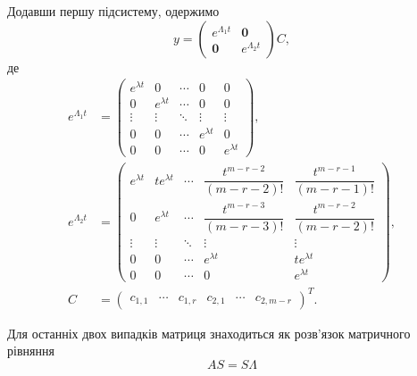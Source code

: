 \begin{enumerate}
Додавши першу підсистему, одержимо
\begin{equation*}
	y = \begin{pmatrix} e^{\Lambda_1 t} & \textbf{0} \\ \textbf{0} & e^{\Lambda_2 t} \end{pmatrix} C,
\end{equation*}
де
\begin{align*}
	e^{\Lambda_1 t} &= 
	\begin{pmatrix} 
		e^{\lambda t} & 0 & \cdots & 0 & 0 \\
		0 & e^{\lambda t} & \cdots & 0 & 0 \\
		\vdots & \vdots & \ddots & \vdots & \vdots \\
		0 & 0 & \cdots & e^{\lambda t} & 0 \\
		0 & 0 & \cdots & 0 & e^{\lambda t}
	\end{pmatrix}, \\
	e^{\Lambda_2 t} &= 
	\begin{pmatrix}
		e^{\lambda t} & t e^{\lambda t} & \cdots & \dfrac{t^{m - r - 2}}{(m - r - 2)!} & \dfrac{t^{m - r - 1}}{(m - r - 1)!} \\
		0 & e^{\lambda t} & \cdots & \dfrac{t^{m - r - 3}}{(m - r - 3)!} & \dfrac{t^{m - r - 2}}{(m - r - 2)!} \\
		\vdots & \vdots & \ddots & \vdots & \vdots \\
		0 & 0 & \cdots & e^{\lambda t} & t e^{\lambda t} \\
		0 & 0 & \cdots & 0 & e^{\lambda t}
	\end{pmatrix}, \\
	C &= \begin{pmatrix} c_{1,1} & \cdots & c_{1,r} & c_{2,1} & \cdots & c_{2,m-r} \end{pmatrix}^T.
\end{align*}

Для останніх двох випадків матриця   знаходиться як розв’язок матричного рівняння
\begin{equation*}
	A S = S \Lambda	
\end{equation*}
\end{enumerate}
